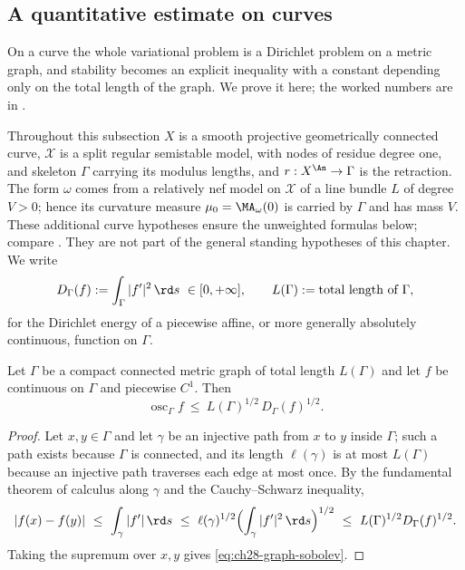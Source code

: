 \subsection{A quantitative estimate on curves}
\label{sec:ch28-curve-stability}

On a curve the whole variational problem is a Dirichlet problem on a metric
graph, and stability becomes an explicit inequality with a constant
depending only on the total length of the graph.  We prove it here; the
worked numbers are in .

Throughout this subsection $X$ is a smooth projective geometrically
connected curve, $\mathcal X$ is a split regular semistable model, with nodes of residue
degree one, and skeleton
$\Gamma$ carrying its modulus lengths, and $r:X^{\An}\to\Gamma$ is the
retraction.  The form $\omega$ comes from a relatively nef model on
$\mathcal X$ of a line bundle $L$ of degree $V>0$; hence its curvature
measure $\mu_0=\MA_\omega(0)$ is carried by $\Gamma$ and has mass $V$.
These additional curve hypotheses ensure the unweighted formulas
below; compare .
They are not part of the general standing hypotheses of this chapter.  We write
\begin{equation}
\label{eq:ch28-dirichlet-form}
 D_\Gamma(f):=\int_\Gamma|f'|^2\,\rd s\ \in[0,+\infty],
 \qquad
 L(\Gamma):=\text{total length of }\Gamma ,
\end{equation}
for the Dirichlet energy of a piecewise affine, or more generally absolutely
continuous, function on $\Gamma$.

\begin{lemma}
\label{lem:ch28-graph-sobolev}
Let $\Gamma$ be a compact connected metric graph of total length
$L(\Gamma)$ and let $f$ be continuous on $\Gamma$ and piecewise
$C^1$.  Then
\begin{equation}
\label{eq:ch28-graph-sobolev}
 \operatorname{osc}_\Gamma f
 \ \leq\ L(\Gamma)^{1/2}\,D_\Gamma(f)^{1/2}.
\end{equation}
\end{lemma}

\begin{proof}
Let $x,y\in\Gamma$ and let $\gamma$ be an injective path from $x$ to
$y$ inside $\Gamma$; such a path exists because $\Gamma$ is connected,
and its length $\ell(\gamma)$ is at most $L(\Gamma)$ because an
injective path traverses each edge at most once.  By the fundamental theorem
of calculus along $\gamma$ and the Cauchy--Schwarz inequality,
\[
 |f(x)-f(y)|
 \ \leq\ \int_\gamma|f'|\,\rd s
 \ \leq\ \ell(\gamma)^{1/2}
   \Bigl(\int_\gamma|f'|^2\,\rd s\Bigr)^{1/2}
 \ \leq\ L(\Gamma)^{1/2}D_\Gamma(f)^{1/2}.
\]
Taking the supremum over $x,y$ gives \eqref{eq:ch28-graph-sobolev}.
\end{proof}

